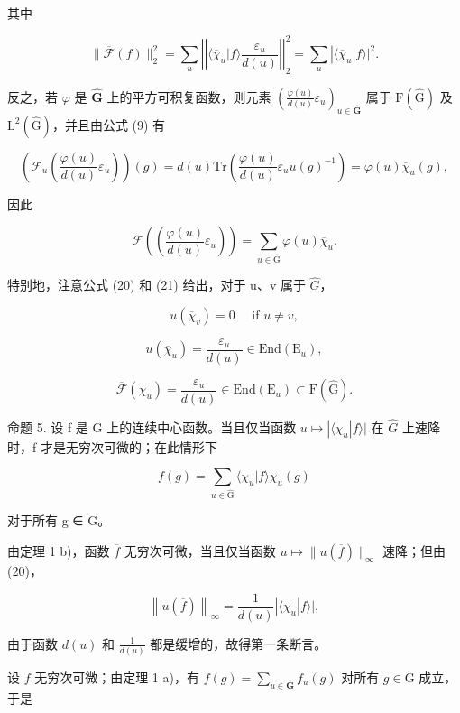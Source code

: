 其中

\[
\| \overline {{\mathcal {F}}} (f) \| _ {2} ^ {2} = \sum_ {u} \left| \left| \langle \overline {{\chi}} _ {u} | f \rangle \frac {\varepsilon_ {u}}{d (u)} \right| \right| _ {2} ^ {2} = \sum_ {u} | \langle \overline {{\chi}} _ {u} | f \rangle | ^ {2}.
\]

反之，若 \(\varphi\) 是 \(\hat{\mathbf{G}}\) 上的平方可积复函数，则元素 \(\left(\frac{\varphi(u)}{d(u)}\varepsilon_u\right)_{u\in \hat{\mathbf{G}}}\) 属于 \(\mathrm{F}(\hat{\mathrm{G}})\) 及 \(\mathrm{L}^2 (\hat{\mathrm{G}})\)，并且由公式 (9) 有

\[
\left(\mathcal {F} _ {u} \left(\frac {\varphi (u)}{d (u)} \varepsilon_ {u}\right)\right) (g) = d (u) \mathrm{Tr} \left(\frac {\varphi (u)}{d (u)} \varepsilon_ {u} u (g) ^ {- 1}\right) = \varphi (u) \overline {{\chi}} _ {u} (g),
\]

因此

\[
\mathcal {F} \left(\left(\frac {\varphi (u)}{d (u)} \varepsilon_ {u}\right)\right) = \sum_ {u \in \hat {\mathrm{G}}} \varphi (u) \overline {{\chi}} _ {u}.\tag{22}
\]

特别地，注意公式 (20) 和 (21) 给出，对于 u、v 属于 \(\hat{G}\)，

\[
u (\overline {{\chi}} _ {v}) = 0 \quad \text { if } u \neq v,\tag{23}
\]

\[
u (\overline {{\chi}} _ {u}) = \frac {\varepsilon_ {u}}{d (u)} \in \mathrm{End} (\mathrm{E} _ {u}),\tag{24}
\]

\[
\overline {{\mathcal {F}}} (\chi_ {u}) = \frac {\varepsilon_ {u}}{d (u)} \in \mathrm{End} (\mathrm{E} _ {u}) \subset \mathrm{F} (\hat {\mathrm{G}}).\tag{25}
\]

命题 5. 设 f 是 G 上的连续中心函数。当且仅当函数 \(u \mapsto |\langle \chi_{u}|f\rangle|\) 在 \(\hat{G}\) 上速降时，f 才是无穷次可微的；在此情形下

\[
f (g) = \sum_ {u \in \hat {\mathrm{G}}} \langle \chi_ {u} | f \rangle \chi_ {u} (g)
\]

对于所有 g ∈ G。

由定理 1 b)，函数 \(\overline{f}\) 无穷次可微，当且仅当函数 \(u \mapsto \| u(\overline{f})\|_{\infty}\) 速降；但由 (20)，

\[
\left\| u (\overline {{f}}) \right\| _ {\infty} = \frac {1}{d (u)} | \langle \chi_ {u} | f \rangle |,
\]

由于函数 \(d(u)\) 和 \(\frac{1}{d(u)}\) 都是缓增的，故得第一条断言。

设 \(f\) 无穷次可微；由定理 1 a)，有 \(f(g) = \sum_{u\in \hat{\mathbf{G}}}f_u(g)\) 对所有 \(g\in \mathrm{G}\) 成立，于是

